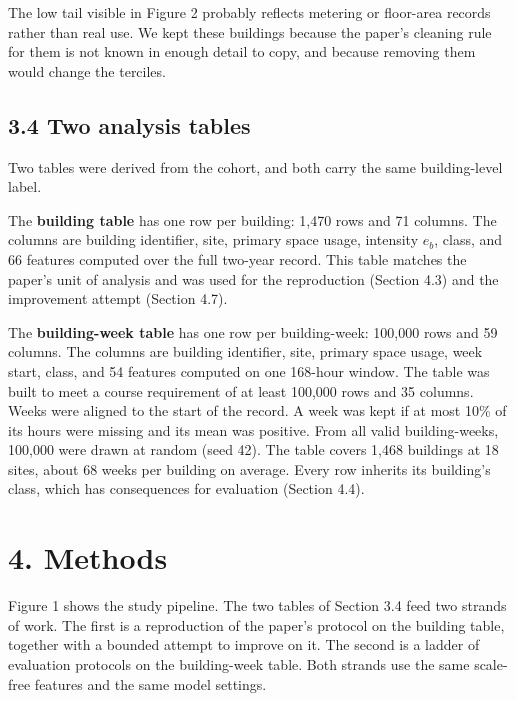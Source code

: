 \documentclass[
  10pt,
]{article}
\begin{document}
The low tail visible in Figure 2 probably reflects metering or
floor-area records rather than real use. We kept these buildings because
the paper's cleaning rule for them is not known in enough detail to
copy, and because removing them would change the terciles.

\hypertarget{two-analysis-tables}{%
\subsection{3.4 Two analysis tables}\label{two-analysis-tables}}

Two tables were derived from the cohort, and both carry the same
building-level label.

The \textbf{building table} has one row per building: 1,470 rows and 71
columns. The columns are building identifier, site, primary space usage,
intensity \(e_b\), class, and 66 features computed over the full
two-year record. This table matches the paper's unit of analysis and was
used for the reproduction (Section 4.3) and the improvement attempt
(Section 4.7).

The \textbf{building-week table} has one row per building-week: 100,000
rows and 59 columns. The columns are building identifier, site, primary
space usage, week start, class, and 54 features computed on one 168-hour
window. The table was built to meet a course requirement of at least
100,000 rows and 35 columns. Weeks were aligned to the start of the
record. A week was kept if at most 10\% of its hours were missing and
its mean was positive. From all valid building-weeks, 100,000 were drawn
at random (seed 42). The table covers 1,468 buildings at 18 sites, about
68 weeks per building on average. Every row inherits its building's
class, which has consequences for evaluation (Section 4.4).

\hypertarget{methods}{%
\section{4. Methods}\label{methods}}

Figure 1 shows the study pipeline. The two tables of Section 3.4 feed
two strands of work. The first is a reproduction of the paper's protocol
on the building table, together with a bounded attempt to improve on it.
The second is a ladder of evaluation protocols on the building-week
table. Both strands use the same scale-free features and the same model
settings.
\end{document}
